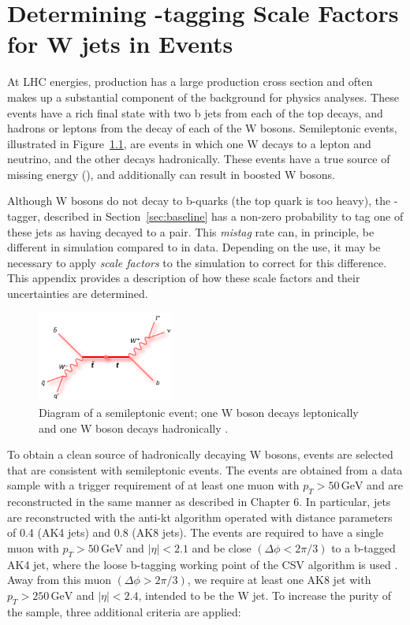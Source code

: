 \chapter{Determining \bbbar-tagging Scale Factors for W jets in \ttbar Events}
\label{chap:bbsf}

At LHC energies, \ttbar production has a large production cross section and often makes up a substantial component of the background for physics analyses. These events have a rich final state with two b jets from each of the top decays, and hadrons or leptons from the decay of each of the W bosons. Semileptonic \ttbar events, illustrated in Figure~\ref{fig:ttbar}, are events in which one W decays to a lepton and neutrino, and the other decays hadronically. These events have a true source of missing energy (\ptmiss), and additionally can result in boosted W bosons.

Although W bosons do not decay to b-quarks (the top quark is too heavy), the \bbbar-tagger, described in Section~\ref{sec:baseline} has a non-zero probability to tag one of these jets as having decayed to a \bbbar pair. This \textit{mistag} rate can, in principle, be different in simulation compared to in data. Depending on the use, it may be necessary to apply \textit{scale factors} to the simulation to correct for this difference. This appendix provides a description of how these scale factors and their uncertainties are determined.

\begin{figure}
\centering
\includegraphics[width=0.4\textwidth]{figs/feynman_ttbar_ljets_beamline.png}
\caption[Diagram of a semileptonic \ttbar event.]{Diagram of a semileptonic \ttbar event; one W boson decays leptonically and one W boson decays hadronically \cite{ttbar}.}
\label{fig:ttbar}
\end{figure}

To obtain a clean source of hadronically decaying W bosons, events are selected that are consistent with semileptonic \ttbar events. The events are obtained from a data sample with a trigger requirement of at least one muon with $p_{T}>50\,\textrm{GeV}$ and are reconstructed in the same manner as described in Chapter 6.  In particular, jets are reconstructed with the anti-kt algorithm \cite{1126-6708-2008-04-063} operated with distance parameters of 0.4 (AK4 jets) and 0.8 (AK8 jets). The events are required to have a single muon with $p_{T}>50\,\textrm{GeV}$ and $|\eta|<2.1$ and be close $(\Delta\phi < 2\pi/3)$ to a b-tagged AK4 jet, where the loose b-tagging working point of the CSV algorithm is used \cite{BTV-16-002}.  Away from this muon $(\Delta\phi > 2\pi/3)$, we require at least one AK8 jet with $p_{T}>250\,\textrm{GeV}$ and $|\eta|<2.4$, intended to be the W jet. To increase the purity of the sample, three additional criteria are applied:

